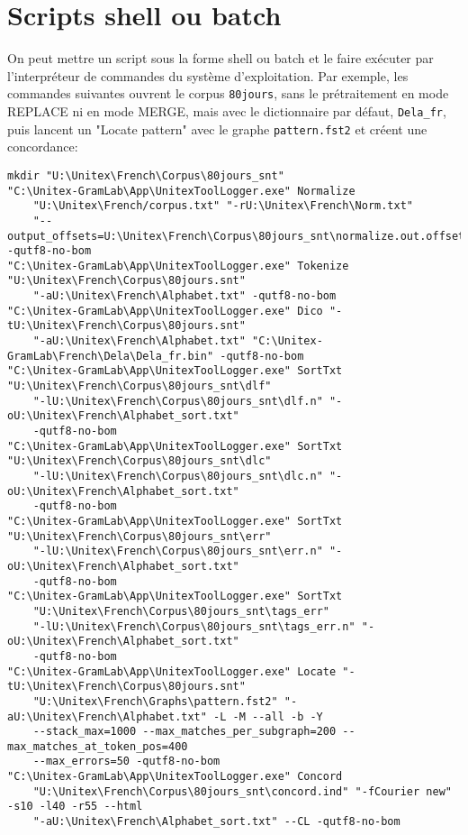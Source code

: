 \section{Scripts shell ou batch}
\label{section-batch}

On peut mettre un script sous la forme shell ou batch et le faire exécuter par l'interpréteur de
commandes du système d'exploitation. Par exemple, les commandes suivantes ouvrent le corpus
\verb$80jours$, sans le prétraitement en mode REPLACE ni en mode MERGE, mais avec le dictionnaire
par défaut, \verb$Dela_fr$, puis lancent un "Locate pattern" avec le graphe \verb$pattern.fst2$
et créent une concordance:

\begin{Verbatim}[fontsize=\small,fontfamily=helvetica]
mkdir "U:\Unitex\French\Corpus\80jours_snt" 
"C:\Unitex-GramLab\App\UnitexToolLogger.exe" Normalize
    "U:\Unitex\French/corpus.txt" "-rU:\Unitex\French\Norm.txt"
    "--output_offsets=U:\Unitex\French\Corpus\80jours_snt\normalize.out.offsets" -qutf8-no-bom
"C:\Unitex-GramLab\App\UnitexToolLogger.exe" Tokenize "U:\Unitex\French\Corpus\80jours.snt" 
    "-aU:\Unitex\French\Alphabet.txt" -qutf8-no-bom
"C:\Unitex-GramLab\App\UnitexToolLogger.exe" Dico "-tU:\Unitex\French\Corpus\80jours.snt" 
    "-aU:\Unitex\French\Alphabet.txt" "C:\Unitex-GramLab\French\Dela\Dela_fr.bin" -qutf8-no-bom
"C:\Unitex-GramLab\App\UnitexToolLogger.exe" SortTxt "U:\Unitex\French\Corpus\80jours_snt\dlf" 
    "-lU:\Unitex\French\Corpus\80jours_snt\dlf.n" "-oU:\Unitex\French\Alphabet_sort.txt"
    -qutf8-no-bom
"C:\Unitex-GramLab\App\UnitexToolLogger.exe" SortTxt "U:\Unitex\French\Corpus\80jours_snt\dlc" 
    "-lU:\Unitex\French\Corpus\80jours_snt\dlc.n" "-oU:\Unitex\French\Alphabet_sort.txt"
    -qutf8-no-bom
"C:\Unitex-GramLab\App\UnitexToolLogger.exe" SortTxt "U:\Unitex\French\Corpus\80jours_snt\err" 
    "-lU:\Unitex\French\Corpus\80jours_snt\err.n" "-oU:\Unitex\French\Alphabet_sort.txt"
    -qutf8-no-bom
"C:\Unitex-GramLab\App\UnitexToolLogger.exe" SortTxt
    "U:\Unitex\French\Corpus\80jours_snt\tags_err"
    "-lU:\Unitex\French\Corpus\80jours_snt\tags_err.n" "-oU:\Unitex\French\Alphabet_sort.txt"
    -qutf8-no-bom
"C:\Unitex-GramLab\App\UnitexToolLogger.exe" Locate "-tU:\Unitex\French\Corpus\80jours.snt" 
    "U:\Unitex\French\Graphs\pattern.fst2" "-aU:\Unitex\French\Alphabet.txt" -L -M --all -b -Y
    --stack_max=1000 --max_matches_per_subgraph=200 --max_matches_at_token_pos=400 
    --max_errors=50 -qutf8-no-bom
"C:\Unitex-GramLab\App\UnitexToolLogger.exe" Concord
    "U:\Unitex\French\Corpus\80jours_snt\concord.ind" "-fCourier new" -s10 -l40 -r55 --html 
    "-aU:\Unitex\French\Alphabet_sort.txt" --CL -qutf8-no-bom
\end{Verbatim}

